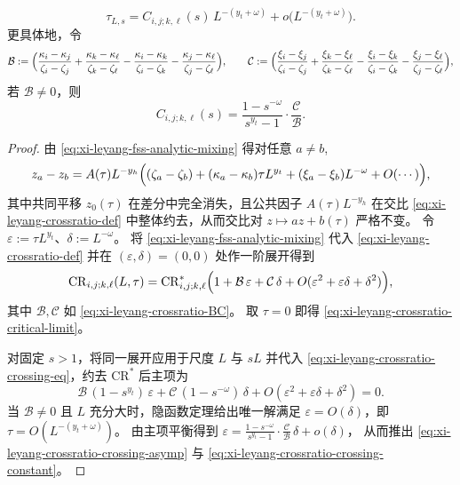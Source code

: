 \begin{theorem}
\begin{enumerate}
  \begin{equation}\label{eq:xi-leyang-crossratio-crossing-asymp}
  \tau_{L,s}
  =
  C_{i,j;k,\ell}(s)\,L^{-(y_t+\omega)}+o\!\bigl(L^{-(y_t+\omega)}\bigr).
  \end{equation}
  更具体地，令
  \begin{equation}\label{eq:xi-leyang-crossratio-BC}
  \mathcal B:=
  \Bigl(\frac{\kappa_i-\kappa_j}{\zeta_i-\zeta_j}+\frac{\kappa_k-\kappa_\ell}{\zeta_k-\zeta_\ell}
  -\frac{\kappa_i-\kappa_k}{\zeta_i-\zeta_k}-\frac{\kappa_j-\kappa_\ell}{\zeta_j-\zeta_\ell}\Bigr),
  \qquad
  \mathcal C:=
  \Bigl(\frac{\xi_i-\xi_j}{\zeta_i-\zeta_j}+\frac{\xi_k-\xi_\ell}{\zeta_k-\zeta_\ell}
  -\frac{\xi_i-\xi_k}{\zeta_i-\zeta_k}-\frac{\xi_j-\xi_\ell}{\zeta_j-\zeta_\ell}\Bigr),
  \end{equation}
  若 \(\mathcal B\neq 0\)，则
  \begin{equation}\label{eq:xi-leyang-crossratio-crossing-constant}
  C_{i,j;k,\ell}(s)=\frac{1-s^{-\omega}}{s^{y_t}-1}\cdot\frac{\mathcal C}{\mathcal B}.
  \end{equation}
\end{enumerate}
\end{theorem}
\begin{proof}
由 \eqref{eq:xi-leyang-fss-analytic-mixing} 得对任意 \(a\neq b\),
\[
z_a-z_b
=
A(\tau)L^{-y_h}\Bigl((\zeta_a-\zeta_b)+(\kappa_a-\kappa_b)\tau L^{y_t}+(\xi_a-\xi_b)L^{-\omega}+O(\cdots)\Bigr),
\]
其中共同平移 \(z_0(\tau)\) 在差分中完全消失，且公共因子 \(A(\tau)L^{-y_h}\) 在交比 \eqref{eq:xi-leyang-crossratio-def} 中整体约去，从而交比对 \(z\mapsto az+b(\tau)\) 严格不变。
令 \(\varepsilon:=\tau L^{y_t}\)、\(\delta:=L^{-\omega}\)。
将 \eqref{eq:xi-leyang-fss-analytic-mixing} 代入 \eqref{eq:xi-leyang-crossratio-def} 并在 \((\varepsilon,\delta)=(0,0)\) 处作一阶展开得到
\[
\mathrm{CR}_{i,j;k,\ell}(L,\tau)
=
\mathrm{CR}_{i,j;k,\ell}^{\ast}
\Bigl(1+\mathcal B\,\varepsilon+\mathcal C\,\delta+O(\varepsilon^{2}+\varepsilon\delta+\delta^{2})\Bigr),
\]
其中 \(\mathcal B,\mathcal C\) 如 \eqref{eq:xi-leyang-crossratio-BC}。
取 \(\tau=0\) 即得 \eqref{eq:xi-leyang-crossratio-critical-limit}。
\par
对固定 \(s>1\)，将同一展开应用于尺度 \(L\) 与 \(sL\) 并代入 \eqref{eq:xi-leyang-crossratio-crossing-eq}，约去 \(\mathrm{CR}^{\ast}\) 后主项为
\[
\mathcal B\,(1-s^{y_t})\,\varepsilon+\mathcal C\,(1-s^{-\omega})\,\delta
+O(\varepsilon^{2}+\varepsilon\delta+\delta^{2})
=0.
\]
当 \(\mathcal B\neq 0\) 且 \(L\) 充分大时，隐函数定理给出唯一解满足 \(\varepsilon=O(\delta)\)，即
\(
\tau=O(L^{-(y_t+\omega)})
\)。
由主项平衡得到
\(
\varepsilon=\frac{1-s^{-\omega}}{s^{y_t}-1}\cdot\frac{\mathcal C}{\mathcal B}\,\delta+o(\delta)
\)，
从而推出 \eqref{eq:xi-leyang-crossratio-crossing-asymp} 与 \eqref{eq:xi-leyang-crossratio-crossing-constant}。
\end{proof}

